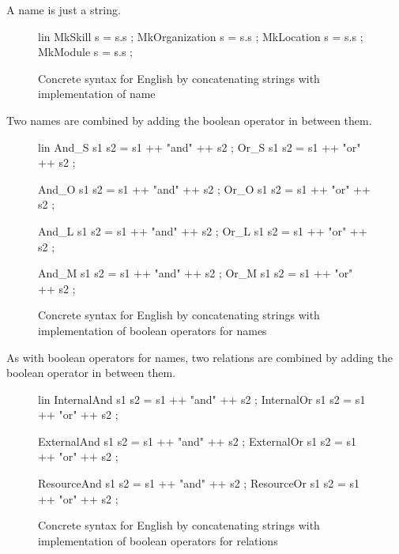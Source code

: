 A name is just a string.

\begin{figure}[H]
\begin{code}
lin
 MkSkill s = s.s ;
 MkOrganization s = s.s ;
 MkLocation s = s.s ;
 MkModule s = s.s ;
\end{code}
\caption{Concrete syntax for English by concatenating strings with implementation of name\label{fig:concat-english-names}}
\end{figure}

Two names are combined by adding the boolean operator in between them.

\begin{figure}[H]
\begin{code}
lin
 And_S s1 s2 = s1 ++ "and" ++ s2 ;
 Or_S s1 s2 = s1 ++ "or" ++ s2 ;
	  
 And_O s1 s2 = s1 ++ "and" ++ s2 ;
 Or_O s1 s2 = s1 ++ "or" ++ s2 ;
	  
 And_L s1 s2 = s1 ++ "and" ++ s2 ;
 Or_L s1 s2 = s1 ++ "or" ++ s2 ;
	  
 And_M s1 s2 = s1 ++ "and" ++ s2 ;
 Or_M s1 s2 = s1 ++ "or" ++ s2 ;
\end{code}
\caption{Concrete syntax for English by concatenating strings with implementation of boolean operators for names\label{fig:concat-english-boolean-names}}
\end{figure}

As with boolean operators for names, two relations are combined by adding the boolean operator in between them.

\begin{figure}[H]
\begin{code}
lin
 InternalAnd s1 s2 = s1 ++ "and" ++ s2 ;
 InternalOr s1 s2 = s1 ++ "or" ++ s2 ;

 ExternalAnd s1 s2 = s1 ++ "and" ++ s2 ;
 ExternalOr s1 s2 = s1 ++ "or" ++ s2 ;

 ResourceAnd s1 s2 = s1 ++ "and" ++ s2 ;
 ResourceOr s1 s2 = s1 ++ "or" ++ s2 ; 
\end{code}
\caption{Concrete syntax for English by concatenating strings with implementation of boolean operators for relations\label{fig:concat-english-boolean-relations}}
\end{figure}

